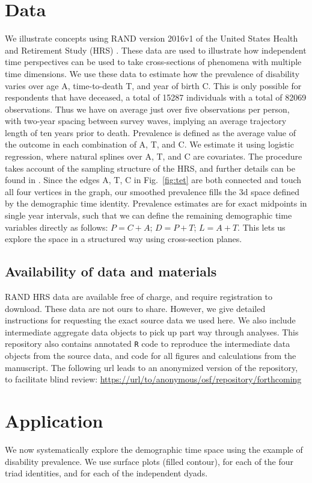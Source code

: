 \documentclass{bmcart}
\begin{document}
\section*{Data}
We illustrate concepts using RAND version 2016v1 of the United States Health and Retirement Study (HRS) \citep{HRS, RAND}. These data are used to illustrate how independent time perspectives can be used to take cross-sections of phenomena with multiple time dimensions. We use these data to estimate how the prevalence of disability varies over age A, time-to-death T, and year of birth C. This is only possible for respondents that have deceased, a total of 15287 individuals with a total of 82069 observations. Thus we have on average just over five observations per person, with two-year spacing between survey waves, implying an average trajectory length of ten years prior to death. Prevalence is defined as the average value of the outcome in each combination of A, T, and C. We estimate it using logistic regression, where natural splines over A, T, and C are covariates. The procedure takes account of the sampling structure of the HRS, and further details can be found in \citet{riffe2017hle}. Since the edges A, T, C in Fig.~\ref{fig:tet} are both connected and touch all four vertices in the graph, our smoothed prevalence fills the 3d space defined by the demographic time identity. Prevalence estimates are for exact midpoints in single year intervals, such that we can define the remaining demographic time variables directly as follows: $P = C + A$; $D = P + T$; $L = A + T$. This lets us explore the space in a structured way using cross-section planes.

\subsection*{Availability of data and materials}
RAND HRS data are available free of charge, and require registration to download. These data are not ours to share. However, we give detailed instructions for requesting the exact source data we used here. We also include intermediate aggregate data objects to pick up part way through analyses. This repository also contains annotated \texttt{R} code to reproduce the intermediate data objects from the source data, and code for all figures and calculations from the manuscript.
The following url leads to an anonymized version of the repository, to facilitate blind review:
\url{https://url/to/anonymous/osf/repository/forthcoming}

\section{Application}
We now systematically explore the demographic time space using the example of disability prevalence. We use surface plots (filled contour), for each of the four triad identities, and for each of the independent dyads.
\end{document}
